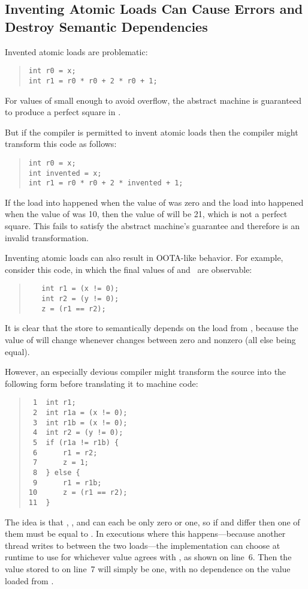 \subsection{Inventing Atomic Loads Can Cause Errors and
Destroy Semantic Dependencies}
\label{sec:Inventing Atomic Loads Can Cause Errors and
Destroy Semantic Dependencies}

Invented atomic loads are problematic:
\begin{quote}
\begin{verbatim}
int r0 = x;
int r1 = r0 * r0 + 2 * r0 + 1;
\end{verbatim}
\end{quote}
For values of  small enough to avoid overflow, the abstract machine is
guaranteed to produce a perfect square in .

But if the compiler is permitted to invent atomic loads then the compiler
might transform this code as follows:
\begin{quote}
\begin{verbatim}
int r0 = x;
int invented = x;
int r1 = r0 * r0 + 2 * invented + 1;
\end{verbatim}
\end{quote}
If the load into  happened when the value of 
was zero and the load into  happened when the value of
 was 10, then the value of  will be 21, which is not
a perfect square.
This fails to satisfy the abstract machine's guarantee
and therefore is an invalid transformation.

Inventing atomic loads can also result in OOTA-like behavior.
For example, consider this code, in which the final values of 
and~ are observable:
\begin{quote}
\begin{verbatim}
   int r1 = (x != 0);
   int r2 = (y != 0);
   z = (r1 == r2);
\end{verbatim}
\end{quote}
It is clear that the store to  semantically depends on the load
from , because the value of  will change whenever 
changes between zero and nonzero (all else being equal).

However, an especially devious compiler might transform the source into
the following form before translating it to machine code:
\begin{quote}
\begin{verbatim}
 1  int r1;
 2  int r1a = (x != 0);
 3  int r1b = (x != 0);
 4  int r2 = (y != 0);
 5  if (r1a != r1b) {
 6      r1 = r2;
 7      z = 1;
 8  } else {
 9      r1 = r1b;
10      z = (r1 == r2);
11  }
\end{verbatim}
\end{quote}
The idea is that , , and  can each be only zero or one,
so if  and  differ then one of them must be equal to .
In executions where this happens---because another thread writes to 
between the two loads---the implementation can choose at runtime to use
for  whichever value agrees with , as shown on line~6.
Then the value stored to  on line~7 will simply be one,
with no dependence on the value loaded from .

